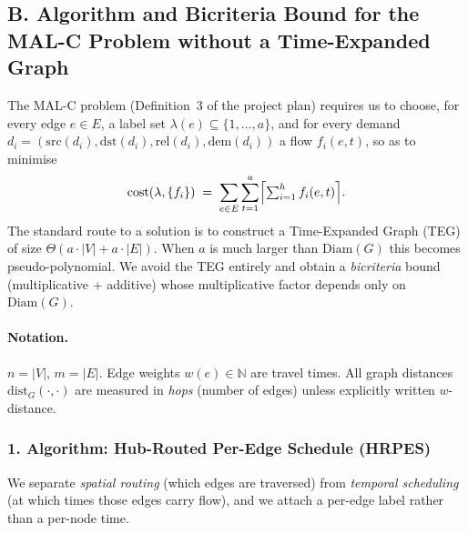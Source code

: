 \documentclass[12pt, a4paper]{article}
\begin{document}
\subsection*{B. Algorithm and Bicriteria Bound for the MAL-C Problem without a Time-Expanded Graph}

The MAL-C problem (Definition~3 of the project plan) requires us to choose, for every edge $e\in E$, a label set $\lambda(e)\subseteq\{1,\dots,a\}$, and for every demand $d_i=(\mathrm{src}(d_i),\mathrm{dst}(d_i),\mathrm{rel}(d_i),\mathrm{dem}(d_i))$ a flow $f_i(e,t)$, so as to minimise
\[
\mathrm{cost}(\lambda,\{f_i\}) \;=\; \sum_{e\in E}\sum_{t=1}^{a}\Bigl\lceil \textstyle\sum_{i=1}^{h} f_i(e,t)\Bigr\rceil .
\]
The standard route to a solution is to construct a Time-Expanded Graph (TEG) of size $\Theta(a\cdot|V|+a\cdot|E|)$. When $a$ is much larger than $\mathrm{Diam}(G)$ this becomes pseudo-polynomial.  We avoid the TEG entirely and obtain a \emph{bicriteria} bound (multiplicative + additive) whose multiplicative factor depends only on $\mathrm{Diam}(G)$.

\paragraph{Notation.} $n=|V|$, $m=|E|$. Edge weights $w(e)\in\mathbb N$ are travel times. All graph distances $\mathrm{dist}_G(\cdot,\cdot)$ are measured in \emph{hops} (number of edges) unless explicitly written $w$-distance.

\subsubsection*{1. Algorithm: Hub-Routed Per-Edge Schedule (HRPES)}

We separate \emph{spatial routing} (which edges are traversed) from \emph{temporal scheduling} (at which times those edges carry flow), and we attach a per-edge label rather than a per-node time.
\end{document}
